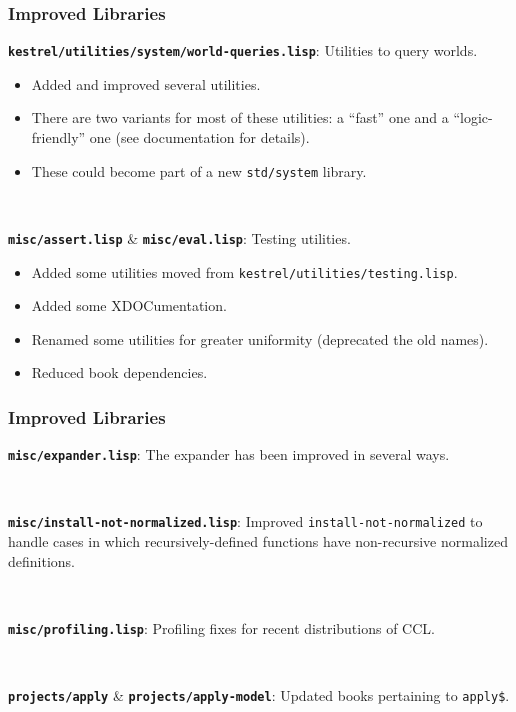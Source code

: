 \documentclass{beamer}
\newcommand{\code}[1]{\texttt{#1}}
\newcommand{\bookpath}[1]{\textbf{\code{#1}}}
\newcommand{\implibtitle}{\frametitle{Improved Libraries}}
\begin{document}
\begin{frame}

\implibtitle

\bookpath{kestrel/utilities/system/world-queries.lisp}:
Utilities to query worlds.
\begin{itemize}
\item
Added and improved several utilities.
\item
There are two variants for most of these utilities:
a ``fast'' one and a ``logic-friendly'' one
(see documentation for details).
\item
These could become part of a new \code{std/system} library.
\end{itemize}

\

\bookpath{misc/assert.lisp} \& \bookpath{misc/eval.lisp}:
Testing utilities.
\begin{itemize}
\item
Added some utilities moved from \code{kestrel/utilities/testing.lisp}.
\item
Added some XDOCumentation.
\item
Renamed some utilities for greater uniformity
(deprecated the old names).
\item
Reduced book dependencies.
\end{itemize}

\end{frame}


\begin{frame}

\implibtitle

\bookpath{misc/expander.lisp}:
The expander has been improved in several ways.

\

\bookpath{misc/install-not-normalized.lisp}:
Improved \code{install-not-normalized} to handle cases in which
recursively-defined functions have non-recursive normalized
definitions.

\

\bookpath{misc/profiling.lisp}:
Profiling fixes for recent distributions of CCL.

\

\bookpath{projects/apply} \& \bookpath{projects/apply-model}:
Updated books pertaining to \code{apply\$}.

\end{frame}
\end{document}
